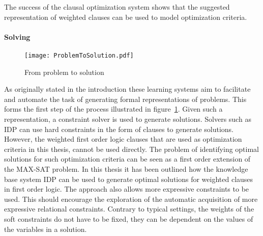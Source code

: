 The success of the clausal optimization system shows that the suggested representation of weighted clauses can be used to model optimization criteria.

\paragraph{Solving}
\begin{figure}

	\caption{From problem to solution}
	\centering
		\texttt{[image: ProblemToSolution.pdf]}
	\label{fig:problem_to_solution2}

\end{figure}

As originally stated in the introduction these learning systems aim to facilitate and automate the task of generating formal representations of problems.
This forms the first step of the process illustrated in figure~\ref{fig:problem_to_solution2}.
Given such a representation, a constraint solver is used to generate solutions.
Solvers such as IDP can use hard constraints in the form of clauses to generate solutions.
However, the weighted first order logic clauses that are used as optimization criteria in this thesis, cannot be used directly.
The problem of identifying optimal solutions for such optimization criteria can be seen as a first order extension of the MAX-SAT problem.
In this thesis it has been outlined how the knowledge base system IDP can be used to generate optimal solutions for weighted clauses in first order logic.
The approach also allows more expressive constraints to be used.
This should encourage the exploration of the automatic acquisition of more expressive relational constraints.
Contrary to typical settings, the weights of the soft constraints do not have to be fixed, they can be dependent on the values of the variables in a solution.

